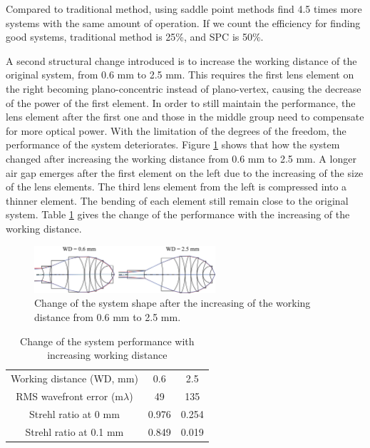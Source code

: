 Compared to traditional method, using saddle point methods find 4.5 times more systems with the same amount of operation. If we count the efficiency for finding good systems, traditional method is 25\%, and SPC is 50\%.

A second structural change introduced is to increase the working distance of the original system, from 0.6 mm to 2.5 mm. This requires the first lens element on the right becoming plano-concentric instead of plano-vertex, causing the decrease of the power of the first element. In order to still maintain the performance, the lens element after the first one and those in the middle group need to compensate for more optical power. With the limitation of the degrees of the freedom, the performance of the system deteriorates. Figure \ref{fig: vollrathWD06to25} shows that how the system changed after increasing the working distance from 0.6 mm to 2.5 mm. A longer air gap emerges after the first element on the left due to the increasing of the size of the lens elements. The third lens element from the left is compressed into a thinner element. The bending of each element still remain close to the original system. Table \ref{table: vollrathWDchange} gives the change of the performance with the increasing of the working distance. 

\begin{figure}[h!]
    \centering
    \includegraphics[width=0.6\textwidth]{chapter-4/figures/Vollrath_WD06TO25.png}
    \caption{Change of the system shape after the increasing of the working distance from 0.6 mm to 2.5 mm.}
    \label{fig: vollrathWD06to25}
\end{figure}

\setlength{\arrayrulewidth}{.5mm}
\setlength{\tabcolsep}{18pt}
\renewcommand{\arraystretch}{1.2}
\begin{table}[h!]
    \centering
    \captionsetup{justification=centering}
    \caption{Change of the system performance with increasing working distance}
    \label{table: vollrathWDchange}
    \vspace{-1em}
    \begin{tabular}{ c c c }
    \hline 
     Working distance (WD, mm) & 0.6 & 2.5\\ 
     \cmidrule{2-3}
    RMS wavefront error (m$\lambda$) & 49 & 135  \\ 
    Strehl ratio at 0 mm & 0.976 & 0.254\\
    Strehl ratio at 0.1 mm & 0.849 & 0.019\\
    \hline
    \end{tabular}
\end{table}

